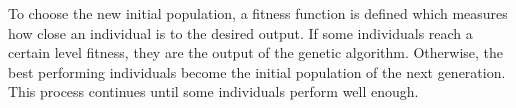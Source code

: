 To choose the new initial population, a fitness function is defined which measures how close an individual is to the desired output.
If some individuals reach a certain level fitness, they are the output of the genetic algorithm.
Otherwise, the best performing individuals become the initial population of the next generation.
This process continues until some individuals perform well enough.

